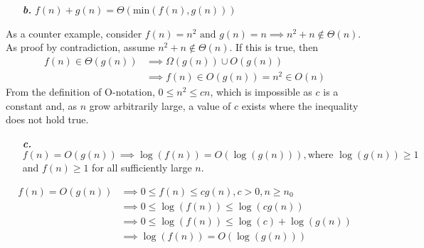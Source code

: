 \documentclass[a4paper,11pt]{article}
\theoremstyle{mytheor}
\begin{document}
\begin{framed}
    \begin{enumerate}
        \item[\textbf{\textit{b.}}] $f(n) + g(n) = \Theta(\text{min}(f(n), 
        g(n)))$
    \end{enumerate}
\end{framed}
As a counter example, consider $f(n) = n^2 \text{ and } g(n) = n \implies n^{2} +
n \notin \Theta(n)$. As proof by contradiction, assume $n^{2} + n \notin 
\Theta(n)$. If this is true, then
\begin{align}
    f(n) \in \Theta(g(n)) & \implies \Omega(g(n)) \cup O(g(n)) \\
                          & \implies f(n) \in O(g(n)) = n^2 \in O(n)
\end{align}
From the definition of O-notation, $0 \le n^2 \le cn$, which is impossible as
$c$ is a constant and, as $n$ grow arbitrarily large, a value of $c$ exists where
the inequality does not hold true. 
\begin{framed}
    \begin{enumerate}
        \item[\textbf{\textit{c.}}] $f(n) = O(g(n)) \implies \log(f(n)) = 
        O(\log(g(n))), \text{where } \log(g(n)) \ge 1$ and $f(n) \ge 1$ for all
        sufficiently large $n$.
    \end{enumerate}
\end{framed}
\begin{align}
    f(n) = O(g(n)) & \implies 0 \le f(n) \le cg(n), c > 0, n \ge n_0 \\
                   & \implies 0 \le \log(f(n)) \le \log(cg(n)) \\
                   & \implies 0 \le \log(f(n)) \le \log(c) + \log(g(n)) \\ 
                   & \implies \log(f(n)) = O(\log(g(n)))
\end{align}
\clearpage



\end{document}
